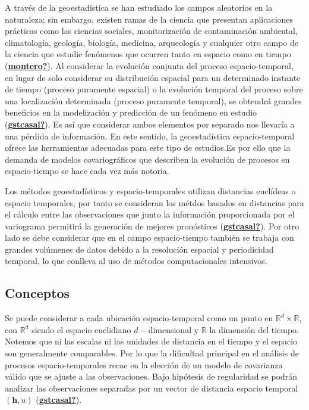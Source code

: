 \documentclass[
]{book}
\begin{document}
A través de la geoestadística se han estudiado los campos aleatorios en la naturaleza; sin embargo, existen ramas de la ciencia que presentan aplicaciones prácticas como las ciencias sociales, monitorización de contaminación ambiental, climatología, geología, biología, medicina, arqueología y cualquier otro campo de la ciencia que estudie fenómenos que ocurren tanto en espacio como en tiempo (\protect\hyperlink{ref-montero}{\textbf{montero?}}). Al considerar la evolución conjunta del proceso espacio-temporal, en lugar de solo considerar su distribución espacial para un determinado instante de tiempo (proceso puramente espacial) o la evolución temporal del proceso sobre una localización determinada (proceso puramente temporal), se obtendrá grandes beneficios en la modelización y predicción de un fenómeno en estudio (\protect\hyperlink{ref-gstcasal}{\textbf{gstcasal?}}). Es así que considerar ambos elementos por separado nos llevaría a una pérdida de información. En este sentido, la geoestadística espacio-temporal ofrece las herramientas adecuadas para este tipo de estudios.Es por ello que la demanda de modelos covariográficos que describen la evolución de procesos en espacio-tiempo se hace cada vez más notoria.

Los métodos geoestadísticos y espacio-temporales utilizan distancias euclídeas o espacio temporales, por tanto se consideran los métdos basados en distancias para el cálculo entre las observaciones que junto la información proporcionada por el variograma permitirá la generación de mejores pronósticos (\protect\hyperlink{ref-gstcasal}{\textbf{gstcasal?}}). Por otro lado se debe considerar que en el campo espacio-tiempo también se trabaja con grandes volúmenes de datos debido a la resolución espacial y periodicidad temporal, lo que conlleva al uso de métodos computacionales intensivos.

\hypertarget{conceptos}{%
\subsection{Conceptos}\label{conceptos}}

Se puede considerar a cada ubicación espacio-temporal como un punto en \(\mathbb{R}^d \times \mathbb{R}\), con \(\mathbb{R}^d\) siendo el espacio euclidiano \(d-\)dimensional y \(\mathbb{R}\) la dimensión del tiempo. Notemos que ni las escalas ni las unidades de distancia en el tiempo y el espacio son generalmente comparables. Por lo que la dificultad principal en el análisis de procesos espacio-temporales recae en la elección de un modelo de covarianza válido que se ajuste a las observaciones. Bajo hipótesis de regularidad se podrán analizar las observaciones separadas por un vector de distancia espacio temporal \((\textbf{h},u)\) (\protect\hyperlink{ref-gstcasal}{\textbf{gstcasal?}}).
\end{document}
